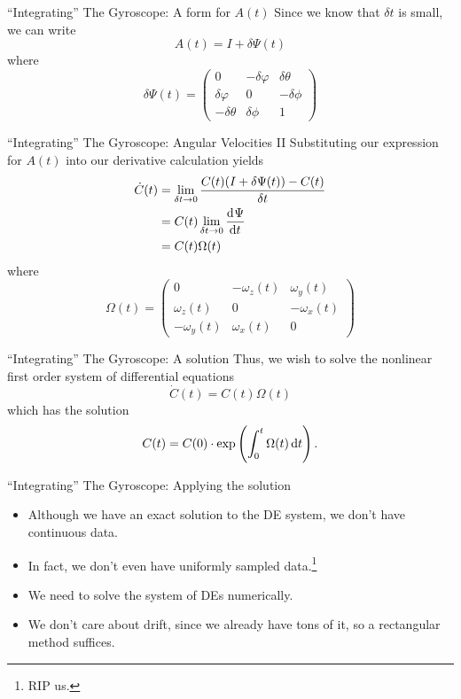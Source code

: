 \documentclass[10pt]{beamer}
\begin{document}
\begin{frame}{``Integrating'' The Gyroscope: A form for \(A(t)\)}
  Since we know that \(\delta t\) is small, we can write
  \[A(t) = I + \delta\Psi(t)\]
  where
  \[\delta\Psi(t) =
    \begin{pmatrix}
      0 & -\delta\varphi &\delta\theta\\
      \delta\varphi & 0 & -\delta\phi\\
      -\delta\theta & \delta\phi & 1
    \end{pmatrix}
  \]
\end{frame}

\begin{frame}{``Integrating'' The Gyroscope: Angular Velocities II}
  Substituting our expression for \(A(t)\) into our derivative calculation yields
  \begin{align*}
    \dot{C}(t) &= \lim_{\delta t \to 0} \frac{C(t)(I + \delta\Psi(t)) - C(t)}{\delta t}\\
               &= C(t)\lim_{\delta t \to 0} \dod{\Psi}{t}\\
               &= C(t)\Omega(t)
  \end{align*}
  where
  \[\Omega(t) =
    \begin{pmatrix}
      0 & -\omega_z(t) & \omega_y(t)\\ \omega_z(t) & 0 & -\omega_x(t) \\ -\omega_y(t) & \omega_x(t) & 0
    \end{pmatrix}
\]
\end{frame}

\begin{frame}{``Integrating'' The Gyroscope: A solution}
  Thus, we wish to solve the nonlinear first order system of differential equations
  \[\dot{C}(t) = C(t) \Omega(t)\]
  which has the solution
  \[C(t) = C(0) \cdot\exp\del{\int_0^t\Omega(t) \dif t}.\]
\end{frame}

\begin{frame}{``Integrating'' The Gyroscope: Applying the solution}
  \begin{itemize}
  \item Although we have an exact solution to the DE system, we don't have continuous data.
  \item In fact, we don't even have uniformly sampled data.\footnote{RIP us.}
  \item We need to solve the system of DEs numerically.
  \item We don't care about drift, since we already have tons of it, so a rectangular method suffices.
  \end{itemize}
\end{frame}
\end{document}
